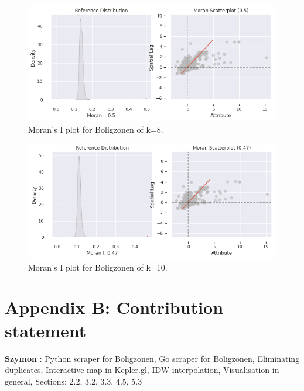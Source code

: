 \documentclass{article}
\begin{document}
\begin{figure}[H]
    \centering
    \includegraphics[width=1\textwidth]{images/morans_i_k_8.png}
    \caption{Moran's I plot for Boligzonen of k=8.}
    \label{boligzonen_k_8}
\end{figure}

\begin{figure}[H]
    \centering
    \includegraphics[width=1\textwidth]{images/morans_i_k_10.png}
    \caption{Moran's I plot for Boligzonen of k=10.}
    \label{boligzonen_k_10}
\end{figure}


\section*{Appendix B: Contribution statement}


\textbf{Szymon} : Python scraper for Boligzonen, Go scraper for Boligzonen, Eliminating duplicates, Interactive map in Kepler.gl, IDW interpolation, Visualisation in general,
Sections: 2.2, 3.2, 3.3, 4.5, 5.3
\end{document}
